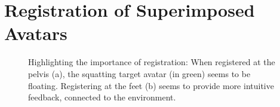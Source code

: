 
\chapter{Registration of Superimposed Avatars \label{chap:registration}}
\begin{figure}[ht]
	\centering
	\caption{Highlighting the importance of registration: When registered at the pelvis (a), the squatting target avatar (in green) seems to be floating. Registering at the feet (b) seems to provide more intuitive feedback, connected to the environment.}
	\label{fig:registrationComparison}
\end{figure}

